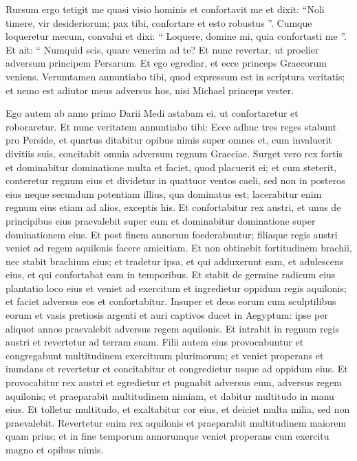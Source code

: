 \begin{biblechapter}
\begin{biblechapter}
\begin{biblechapter}
\begin{biblechapter}
\begin{biblechapter}
\begin{biblechapter}
\begin{biblechapter}
\begin{biblechapter}
\begin{biblechapter}
\begin{biblechapter}
\verse Rursum ergo tetigit me quasi visio hominis et confortavit me 
\verse et dixit: “Noli timere, vir desideriorum; pax tibi, confortare et esto robustus ”. Cumque loqueretur mecum, convalui et dixi: “ Loquere, domine mi, quia confortasti me ”.
 \verse Et ait: “ Numquid scis, quare venerim ad te? Et nunc revertar, ut proelier adversum principem Persarum. Et ego egrediar, et ecce princeps Graecorum veniens. 
\verse Verumtamen annuntiabo tibi, quod expressum est in scriptura veritatis; et nemo est adiutor meus adversus hos, nisi Michael princeps vester.
 
\begin{biblechapter}
\verse Ego autem ab anno primo Darii Medi astabam ei, ut confortaretur et roboraretur. 
\verse Et nunc veritatem annuntiabo tibi: Ecce adhuc tres reges stabunt pro Perside, et quartus ditabitur opibus nimis super omnes et, cum invaluerit divitiis suis, concitabit omnia adversum regnum Graeciae. 
\verse Surget vero rex fortis et dominabitur dominatione multa et faciet, quod placuerit ei; 
\verse et cum steterit, conteretur regnum eius et dividetur in quattuor ventos caeli, sed non in posteros eius neque secundum potentiam illius, qua dominatus est; lacerabitur enim regnum eius etiam ad alios, exceptis his. 
 \verse Et confortabitur rex austri, et unus de principibus eius praevalebit super eum et dominabitur dominatione super dominationem eius. 
\verse Et post finem annorum foederabuntur; filiaque regis austri veniet ad regem aquilonis facere amicitiam. Et non obtinebit fortitudinem brachii, nec stabit brachium eius; et tradetur ipsa, et qui adduxerunt eam, et adulescens eius, et qui confortabat eam in temporibus. 
\verse Et stabit de germine radicum eius plantatio loco eius et veniet ad exercitum et ingredietur oppidum regis aquilonis; et faciet adversus eos et confortabitur. 
\verse Insuper et deos eorum cum sculptilibus eorum et vasis pretiosis argenti et auri captivos ducet in Aegyptum: ipse per aliquot annos praevalebit adversus regem aquilonis. 
\verse Et intrabit in regnum regis austri et revertetur ad terram suam. 
\verse Filii autem eius provocabuntur et congregabunt multitudinem exercituum plurimorum; et veniet properans et inundans et revertetur et concitabitur et congredietur usque ad oppidum eius. 
\verse Et provocabitur rex austri et egredietur et pugnabit adversus eum, adversus regem aquilonis; et praeparabit multitudinem nimiam, et dabitur multitudo in manu eius. 
\verse Et tolletur multitudo, et exaltabitur cor eius, et deiciet multa milia, sed non praevalebit. 
\verse Revertetur enim rex aquilonis et praeparabit multitudinem maiorem quam prius; et in fine temporum annorumque veniet properans cum exercitu magno et opibus nimis. 

\end{biblechapter}
\end{biblechapter}
\end{biblechapter}
\end{biblechapter}
\end{biblechapter}
\end{biblechapter}
\end{biblechapter}
\end{biblechapter}
\end{biblechapter}
\end{biblechapter}
\end{biblechapter}
